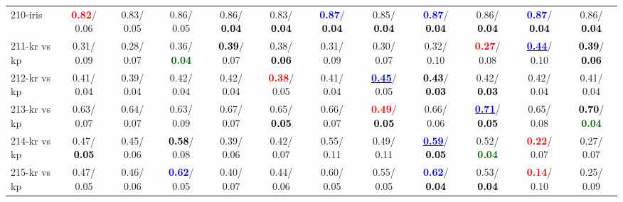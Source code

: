 \begin{table}[h]
\begin{center}
{\begin{tabular}{lc|c|c|c|c|c|c|c|c|c|c}
210-iris & \textcolor{red}{\textbf{  0.82}}/  0.06 &   0.83/  0.05 &   0.86/  0.05 &   0.86/\textcolor{black}{\textbf{  0.04}} &   0.83/\textcolor{black}{\textbf{  0.04}} & \textcolor{blue}{\textbf{  0.87}}/\textcolor{black}{\textbf{  0.04}} &   0.85/\textcolor{black}{\textbf{  0.04}} & \textcolor{blue}{\textbf{  0.87}}/\textcolor{black}{\textbf{  0.04}} &   0.86/\textcolor{black}{\textbf{  0.04}} & \textcolor{blue}{\textbf{  0.87}}/\textcolor{black}{\textbf{  0.04}} &   0.86/\textcolor{black}{\textbf{  0.04}} \\
211-kr vs kp &   0.31/  0.09 &   0.28/  0.07 &   0.36/\textcolor{darkgreen}{\textbf{  0.04}} & \textcolor{black}{\textbf{  0.39}}/  0.07 &   0.38/\textcolor{black}{\textbf{  0.06}} &   0.31/  0.09 &   0.30/  0.07 &   0.32/  0.10 & \textcolor{red}{\textbf{  0.27}}/  0.08 & \underline{\textcolor{blue}{\textbf{  0.44}}}/  0.10 & \textcolor{black}{\textbf{  0.39}}/\textcolor{black}{\textbf{  0.06}} \\
212-kr vs kp &   0.41/  0.04 &   0.39/  0.04 &   0.42/  0.04 &   0.42/  0.04 & \textcolor{red}{\textbf{  0.38}}/  0.05 &   0.41/  0.04 & \underline{\textcolor{blue}{\textbf{  0.45}}}/  0.05 & \textcolor{black}{\textbf{  0.43}}/\textcolor{black}{\textbf{  0.03}} &   0.42/\textcolor{black}{\textbf{  0.03}} &   0.42/  0.04 &   0.41/  0.04 \\
213-kr vs kp &   0.63/  0.07 &   0.64/  0.07 &   0.63/  0.09 &   0.67/  0.07 &   0.65/\textcolor{black}{\textbf{  0.05}} &   0.66/  0.07 & \textcolor{red}{\textbf{  0.49}}/\textcolor{black}{\textbf{  0.05}} &   0.66/  0.06 & \underline{\textcolor{blue}{\textbf{  0.71}}}/\textcolor{black}{\textbf{  0.05}} &   0.65/  0.08 & \textcolor{black}{\textbf{  0.70}}/\textcolor{darkgreen}{\textbf{  0.04}} \\ \hline
214-kr vs kp &   0.47/\textcolor{black}{\textbf{  0.05}} &   0.45/  0.06 & \textcolor{black}{\textbf{  0.58}}/  0.08 &   0.39/  0.06 &   0.42/  0.07 &   0.55/  0.11 &   0.49/  0.11 & \underline{\textcolor{blue}{\textbf{  0.59}}}/\textcolor{black}{\textbf{  0.05}} &   0.52/\textcolor{darkgreen}{\textbf{  0.04}} & \textcolor{red}{\textbf{  0.22}}/  0.07 &   0.27/  0.07 \\
215-kr vs kp &   0.47/  0.05 &   0.46/  0.06 & \textcolor{blue}{\textbf{  0.62}}/  0.05 &   0.40/  0.07 &   0.44/  0.06 &   0.60/  0.05 &   0.55/  0.05 & \textcolor{blue}{\textbf{  0.62}}/\textcolor{black}{\textbf{  0.04}} &   0.53/\textcolor{black}{\textbf{  0.04}} & \textcolor{red}{\textbf{  0.14}}/  0.10 &   0.25/  0.09 \\

\end{tabular}}
\end{center}
\end{table}

